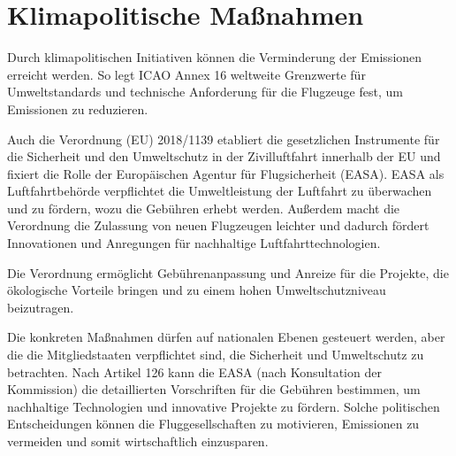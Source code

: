 \section{Klimapolitische Maßnahmen}
\label{s:Klimapolitische Maßnahmen}


Durch klimapolitischen Initiativen können die Verminderung der Emissionen erreicht werden. 
So legt ICAO Annex 16 weltweite Grenzwerte für Umweltstandards und technische Anforderung für die Flugzeuge fest, um Emissionen zu reduzieren.

Auch die Verordnung (EU) 2018/1139 etabliert die gesetzlichen Instrumente für die Sicherheit und den Umweltschutz in der Zivilluftfahrt innerhalb der EU 
und fixiert die Rolle der Europäischen Agentur für Flugsicherheit (EASA). EASA als Luftfahrtbehörde verpflichtet die 
Umweltleistung der Luftfahrt zu überwachen und zu fördern, wozu die Gebühren erhebt werden. Außerdem macht die Verordnung die Zulassung von
neuen Flugzeugen leichter und dadurch fördert Innovationen und Anregungen für nachhaltige Luftfahrttechnologien.

Die Verordnung ermöglicht Gebührenanpassung und Anreize für die Projekte, die ökologische Vorteile bringen und 
zu einem hohen Umweltschutzniveau beizutragen.

Die konkreten Maßnahmen dürfen auf nationalen Ebenen gesteuert werden, aber die die Mitgliedstaaten verpflichtet sind, 
die Sicherheit und Umweltschutz zu betrachten. Nach Artikel 126 kann die EASA (nach Konsultation der Kommission) die detaillierten 
Vorschriften für die Gebühren bestimmen, um nachhaltige Technologien und innovative Projekte zu fördern.
%
%
%
Solche politischen Entscheidungen können die Fluggesellschaften zu motivieren, Emissionen zu vermeiden und somit wirtschaftlich einzusparen.

